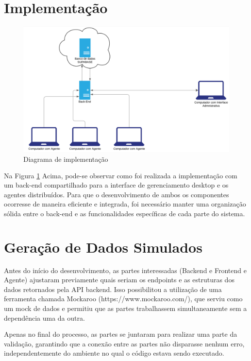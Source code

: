 \section{Implementação}

\begin{figure} [H]
    \centering
    \includegraphics[width=1\linewidth]{figuras/INFRAIMPLE.png}
    \caption{Diagrama de implementação}
    \label{fig:diaimplementa}
\end{figure}
Na Figura \ref{fig:diaimplementa} Acima, pode-se observar como foi realizada a implementação com um back-end compartilhado para a interface de gerenciamento desktop e os agentes distribuídos. Para que o desenvolvimento de ambos os componentes ocorresse de maneira eficiente e integrada, foi necessário manter uma organização sólida entre o back-end e as funcionalidades específicas de cada parte do sistema.

\section{Geração de Dados Simulados}
Antes do início do desenvolvimento, as partes interessadas (Backend e Frontend e Agente) ajustaram previamente quais seriam os endpoints e as estruturas dos dados retornados pela API backend. Isso possibilitou a utilização de uma ferramenta chamada Mockaroo (https://www.mockaroo.com/), que serviu como um mock de dados e permitiu que as partes trabalhassem simultaneamente sem a dependência uma da outra.

Apenas no final do processo, as partes se juntaram para realizar uma parte da validação, garantindo que a conexão entre as partes não disparasse nenhum erro, independentemente do ambiente no qual o código estava sendo executado.


